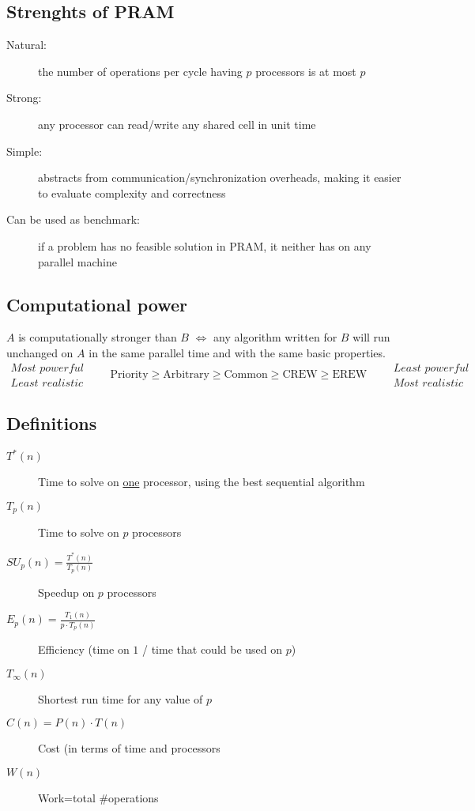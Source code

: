 \documentclass{article}
\begin{document}
\subsection{Strenghts of PRAM}
\begin{description}
\item[Natural:] the number of operations per cycle having $p$ processors is at most $p$
\item[Strong:] any processor can read/write any shared cell in unit time
\item[Simple:]  abstracts from communication/synchronization overheads, making it easier to evaluate complexity and correctness
\item[Can be used as benchmark:] if a problem has no feasible solution in PRAM, it neither has on any parallel machine
\end{description}

\subsection{Computational power} $A$ is computationally stronger than $B$ $\iff$ any algorithm written for $B$  will run unchanged on $A$ in the same parallel time and with  the same basic properties.
\[
\substack{\textit{Most powerful}\\ \textit{Least realistic}}
\qquad
\text{Priority}\geq \text{Arbitrary}\geq \text{Common} \geq \text{CREW} \geq \text{EREW}
\qquad
\substack{\textit{Least powerful}\\ \textit{Most realistic}}
\]

\subsection{Definitions}
\begin{description}
\item[$T^*(n)$] Time to solve on \underline{one} processor, using the best sequential algorithm
\item[$T_p(n)$] Time to solve on $p$ processors
\item[$SU_p(n)=\frac{T^*(n)}{T_p(n)}$] Speedup on $p$ processors
\item[$E_p(n)=\frac{T_1(n)}{p\cdot T_p(n)}$] Efficiency (time on $1$ / time that could be used on $p$)
\item[$T_\infty(n)$] Shortest run time for any value of $p$
\item[$C(n)=P(n)\cdot T(n)$] Cost (in terms of time and processors
\item[$W(n)$] Work=total \#operations
\end{description}
\end{document}
